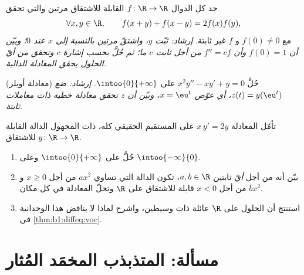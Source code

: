\begin{exercise}[$\star\star\star$]\label{exo:b1:diffeq:10}
جد كل الدوال $f \colon \R \to \R$ القابلة للاشتقاق مرتين والتي
تحقق
\[
\forall x, y \in \R, \qquad f(x + y) + f(x - y) = 2 f(x) f(y),
\]
مع $f(0) \ne 0$ و $f$ غير ثابتة.
\emph{إرشاد: ثبّت $y$، واشتقّ مرتين بالنسبة إلى $x$ عند $0$؛
وبيّن أن $f(0) = 1$ وأن $f'' = c f$ من أجل ثابت $c$ ما؛ ثم حُلَّ
بحسب إشارة $c$ وتحقق من أيّ الحلول يحقق المعادلة
الدالية.}
\end{exercise}

\begin{exercise}[$\star\star$]\label{exo:b1:diffeq:11}
(معادلة أويلر) حُلَّ $x^2 y'' - x y' + y = 0$ على
$\intoo{0}{+\infty}$. \emph{إرشاد: ضع $z(t) = y(\eu^t)$، أي
عوّض $x = \eu^t$، وبيّن أن $z$ تحقق معادلة خطية
ذات معاملات ثابتة.}
\end{exercise}

\begin{exercise}[$\star\star\star$]\label{exo:b1:diffeq:12}
تأمّل المعادلة $x\,y' = 2y$ على المستقيم الحقيقي كله، ذات
المجهول الدالة القابلة للاشتقاق $y \colon \R \to \R$.
\begin{enumerate}
  \item حُلَّ على $\intoo{0}{+\infty}$ وعلى $\intoo{-\infty}{0}$.
  \item بيّن أنه من أجل \emph{أيّ} ثابتين $a, b \in \R$، تكون
        الدالة التي تساوي $ax^2$ من أجل $x \geq 0$ و $bx^2$ من أجل
        $x < 0$ قابلة للاشتقاق على $\R$ وتحلّ المعادلة
        في كل مكان.
  \item استنتج أن  الحلول على $\R$ عائلة ذات
        وسيطين، واشرح لماذا لا يناقض هذا
        الوحدانية في \cref{thm:b1:diffeq:voc}.
\end{enumerate}
\end{exercise}

\section{مسألة: المتذبذب المخمَد المُثار}

